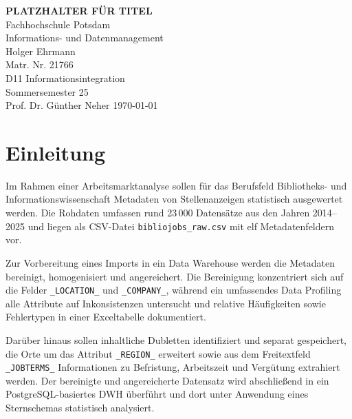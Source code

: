 \documentclass[
    a4paper,
    12pt,
    headinclude=true,
    BCOR=10mm,
]{scrreprt}
\begin{document}
\begin{titlepage}
    \centering
    \vspace*{1cm}
    \Large{\textbf{PLATZHALTER FÜR TITEL}}\\
    \vspace{1.5cm}
    \Large{Fachhochschule Potsdam}\\
    \vspace{0.5cm}
    \large{Informations- und Datenmanagement}\\
    \vspace{1.5cm}
    Holger Ehrmann\\
    Matr. Nr. 21766\\
    \vspace{1cm}
    D11 Informationsintegration\\
    Sommersemester 25\\
    Prof. Dr. Günther Neher
    \vfill
    \today
\end{titlepage}
\setcounter{tocdepth}{1}
\begingroup
{} %
{\small \tableofcontents}
\endgroup

\chapter{Einleitung}

Im Rahmen einer Arbeitsmarktanalyse sollen für das Berufsfeld Bibliotheks- und Informationswissenschaft Metadaten von Stellenanzeigen statistisch ausgewertet werden. Die Rohdaten umfassen rund 23\,000 Datensätze aus den Jahren 2014--2025 und liegen als CSV-Datei \texttt{bibliojobs\_raw.csv} mit elf Metadatenfeldern vor.

Zur Vorbereitung eines Imports in ein Data Warehouse werden die Metadaten bereinigt, homogenisiert und angereichert. Die Bereinigung konzentriert sich auf die Felder \texttt{\_LOCATION\_} und \texttt{\_COMPANY\_}, während ein umfassendes Data Profiling alle Attribute auf Inkonsistenzen untersucht und relative Häufigkeiten sowie Fehlertypen in einer Exceltabelle dokumentiert.

Darüber hinaus sollen inhaltliche Dubletten identifiziert und separat gespeichert, die Orte um das Attribut \texttt{\_REGION\_} erweitert sowie aus dem Freitextfeld \texttt{\_JOBTERMS\_} Informationen zu Befristung, Arbeitszeit und Vergütung extrahiert werden. Der bereinigte und angereicherte Datensatz wird abschließend in ein PostgreSQL-basiertes DWH überführt und dort unter Anwendung eines Sternschemas statistisch analysiert.
\end{document}
